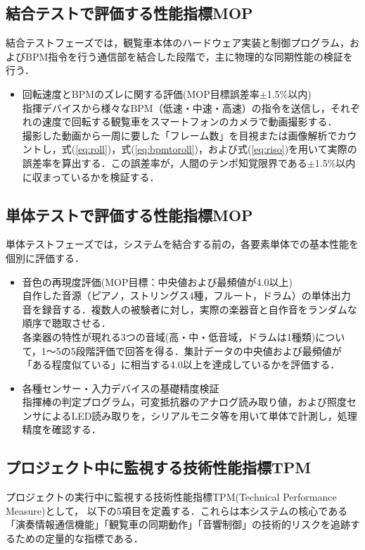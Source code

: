 \documentclass[lualatex,book,paper=a4paper,jafontsize=11.5pt,jafontscale=1.05]{jlreq}
\begin{document}
\subsection{結合テストで評価する性能指標MOP}
結合テストフェーズでは，観覧車本体のハードウェア実装と制御プログラム，およびBPM指令を行う通信部を結合した段階で，主に物理的な同期性能の検証を行う．

\begin{itemize}
	\item 回転速度とBPMのズレに関する評価(MOP目標誤差率$\pm$1.5\%以内)
	\\ 指揮デバイスから様々なBPM（低速・中速・高速）の指令を送信し，それぞれの速度で回転する観覧車をスマートフォンのカメラで動画撮影する．
	\\ 撮影した動画から一周に要した「フレーム数」を目視または画像解析でカウントし，式(\ref{eq:roll})，式(\ref{eq:bpmtoroll})，および式(\ref{eq:riso})を用いて実際の誤差率を算出する．この誤差率が，人間のテンポ知覚限界である$\pm$1.5\%以内に収まっているかを検証する．
\end{itemize}
\subsection{単体テストで評価する性能指標MOP}
単体テストフェーズでは，システムを結合する前の，各要素単体での基本性能を個別に評価する．

\begin{itemize}
	\item 音色の再現度評価(MOP目標：中央値および最頻値が4.0以上)
		\\ 自作した音源（ピアノ，ストリングス4種，フルート，ドラム）の単体出力音を録音する．複数人の被験者に対し，実際の楽器音と自作音をランダムな順序で聴取させる．
		\\ 各楽器の特性が現れる3つの音域(高・中・低音域，ドラムは1種類)について，1〜5の5段階評価で回答を得る．集計データの中央値および最頻値が「ある程度似ている」に相当する4.0以上を達成しているかを評価する．
	
	\item 各種センサー・入力デバイスの基礎精度検証
	\\ 指揮棒の判定プログラム，可変抵抗器のアナログ読み取り値，および照度センサによるLED読み取りを，シリアルモニタ等を用いて単体で計測し，処理精度を確認する．
\end{itemize}

\subsection{プロジェクト中に監視する技術性能指標TPM}
プロジェクトの実行中に監視する技術性能指標TPM(Technical Performance Measure)として，
以下の5項目を定義する．これらは本システムの核心である「演奏情報通信機能」「観覧車の同期動作」「音響制御」の技術的リスクを追跡するための定量的な指標である．
\end{document}
